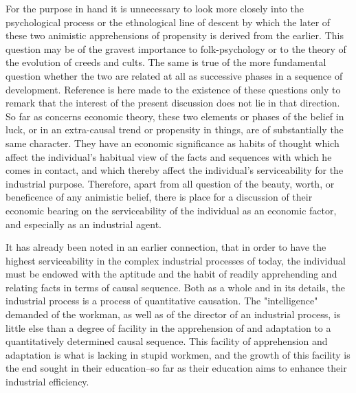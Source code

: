 \documentclass[12pt]{report}
\begin{document}
For the purpose in hand it is unnecessary to look more closely into the
psychological process or the ethnological line of descent by which the
later of these two animistic apprehensions of propensity is derived
from the earlier. This question may be of the gravest importance to
folk-psychology or to the theory of the evolution of creeds and cults.
The same is true of the more fundamental question whether the two
are related at all as successive phases in a sequence of development.
Reference is here made to the existence of these questions only to
remark that the interest of the present discussion does not lie in that
direction. So far as concerns economic theory, these two elements or
phases of the belief in luck, or in an extra-causal trend or propensity
in things, are of substantially the same character. They have an
economic significance as habits of thought which affect the individual's
habitual view of the facts and sequences with which he comes in contact,
and which thereby affect the individual's serviceability for the
industrial purpose. Therefore, apart from all question of the beauty,
worth, or beneficence of any animistic belief, there is place for
a discussion of their economic bearing on the serviceability of the
individual as an economic factor, and especially as an industrial agent.

It has already been noted in an earlier connection, that in order to
have the highest serviceability in the complex industrial processes of
today, the individual must be endowed with the aptitude and the habit
of readily apprehending and relating facts in terms of causal sequence.
Both as a whole and in its details, the industrial process is a process
of quantitative causation. The "intelligence" demanded of the workman,
as well as of the director of an industrial process, is little else
than a degree of facility in the apprehension of and adaptation to a
quantitatively determined causal sequence. This facility of apprehension
and adaptation is what is lacking in stupid workmen, and the growth
of this facility is the end sought in their education--so far as their
education aims to enhance their industrial efficiency.
\end{document}
